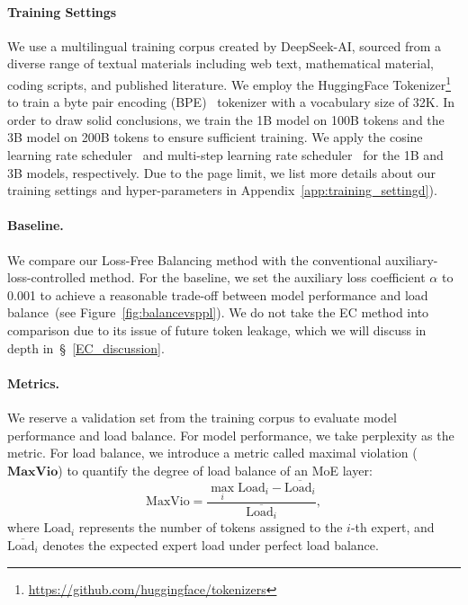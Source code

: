 \documentclass{article}
\newcommand{\ours}{Loss-Free Balancing}
\begin{document}
\paragraph{Training Settings}
We use a multilingual training corpus created by DeepSeek-AI, sourced from a diverse range of textual materials including web text, mathematical material, coding scripts, and published
literature.
We employ the HuggingFace Tokenizer\footnote{\url{https://github.com/huggingface/tokenizers}} to train a byte pair encoding (BPE)~\citep{Sennrich2015NeuralMT} tokenizer with a vocabulary size of 32K. 
In order to draw solid conclusions, we train the 1B model on 100B tokens and the 3B model on 200B tokens to ensure sufficient training. 
We apply the cosine learning rate scheduler~\citep{Loshchilov2016SGDRSG} and multi-step learning rate scheduler~\citep{Dai2024DeepSeekMoETU} for the 1B and 3B models, respectively. 
Due to the page limit, we list more details about our training settings and hyper-parameters in Appendix~\ref{app:training_settingd}).

\paragraph{Baseline.}
We compare our \ours{} method with the conventional auxiliary-loss-controlled method. 
For the baseline, we set the auxiliary loss coefficient $\alpha$ to 0.001 to achieve a reasonable trade-off between model performance and load balance~(see Figure~\ref{fig:balancevsppl}). 
We do not take the EC method into comparison due to its issue of future token leakage, which we will discuss in depth in~\S~\ref{EC_discussion}.

\paragraph{Metrics.}
\label{subsec:metrics}
We reserve a validation set from the training corpus to evaluate model performance and load balance. 
For model performance, we take perplexity as the metric. 
For load balance, we introduce a metric called maximal violation ($\textbf{MaxVio}$) to quantify the degree of load balance of an MoE layer: 
\begin{equation}
    \text{MaxVio} = \frac{\max_i \text{Load}_{i} - \overline{\text{Load}_{i}}}{\overline{\text{Load}_{i}}},
\end{equation}
where $\text{Load}_{i}$ represents the number of tokens assigned to the $i$-th expert, and $\overline{\text{Load}_{i}}$ denotes the expected expert load under perfect load balance. 
\end{document}
